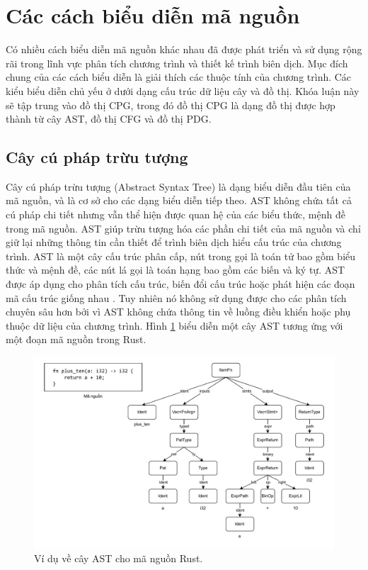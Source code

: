 \section{Các cách biểu diễn mã nguồn}

Có nhiều cách biểu diễn mã nguồn khác nhau đã được phát triển và sử dụng rộng rãi trong lĩnh vực phân tích chương trình và thiết kế trình biên dịch.
Mục đích chung của các cách biểu diễn là giải thích các thuộc tính của chương trình.
Các kiểu biểu diễn chủ yếu ở dưới dạng cấu trúc dữ liệu cây và đồ thị.
Khóa luận này sẽ tập trung vào đồ thị CPG, trong đó đồ thị CPG là dạng đồ thị được hợp thành từ cây AST, đồ thị CFG và đồ thị PDG.

\subsection{Cây cú pháp trừu tượng}

Cây cú pháp trừu tượng (Abstract Syntax Tree) \cite{zhang2019novel} là dạng biểu diễn đầu tiên của mã nguồn, và là cơ sở cho các dạng biểu diễn tiếp theo.
AST không chứa tất cả cú pháp chi tiết nhưng vẫn thể hiện được quan hệ của các biểu thức, mệnh đề trong mã nguồn.
AST giúp trừu tượng hóa các phần chi tiết của mã nguồn và chỉ giữ lại những thông tin cần thiết để trình biên dịch hiểu cấu trúc của chương trình.
AST là một cây cấu trúc phân cấp, nút trong gọi là toán tử bao gồm biểu thức và mệnh đề, các nút lá gọi là toán hạng bao gồm các biến và ký tự.
AST được áp dụng cho phân tích cấu trúc, biến đổi cấu trúc hoặc phát hiện các đoạn mã cấu trúc giống nhau \cite{yamaguchi2012generalized}.
Tuy nhiên nó không sử dụng được cho các phân tích chuyên sâu hơn bởi vì AST không chứa thông tin về luồng điều khiển hoặc phụ thuộc dữ liệu của chương trình.
Hình \ref{img:c2_ast} biểu diễn một cây AST tương ứng với một đoạn mã nguồn trong Rust.

\begin{figure}[H]
  \includegraphics[width=1\columnwidth]{figures/c2/c2_ast.drawio.pdf}
  \centering
  \caption{Ví dụ về cây AST cho mã nguồn Rust.}
  \label{img:c2_ast}
\end{figure}

